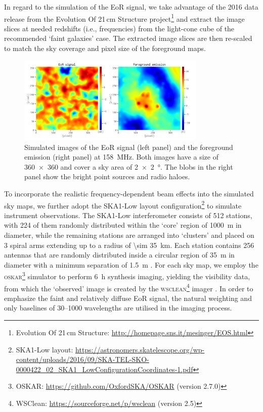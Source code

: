 \documentclass[fleqn,usenatbib]{mnras}
\newcommand{\editwip}[1]{{\leavevmode\color{magenta}#1}}
\begin{document}
{In regard to the simulation of the EoR signal, we take advantage of the
2016 data release from the Evolution Of 21\,cm Structure project\footnote{%
  Evolution Of 21\,cm Structure:
  \url{http://homepage.sns.it/mesinger/EOS.html}}
\citep{mesinger2016} and extract the image slices at needed redshifts
(i.e., frequencies) from the light-cone cube of the recommended
`faint galaxies' case.
The extracted image slices are then re-scaled to match the sky coverage and
pixel size of the foreground maps.

\begin{figure}
  \centering
  \includegraphics[width=0.8\textwidth]{obsimg-158}
  \caption{\label{fig:obsimg}\editwip{%
    Simulated images of the EoR signal (left panel) and the foreground
    emission (right panel) at \SI{158}{\MHz}.
    Both images have a size of \num{360 x 360} and cover a sky area of
    \SI{2 x 2}{\degree}.
    The blobs in the right panel show the bright point sources and radio
    haloes.
  }}
\end{figure}

To incorporate the realistic frequency-dependent beam effects into the
simulated sky maps, we further adopt the SKA1-Low layout
configuration\footnote{\raggedright%
  SKA1-Low layout:
  \url{https://astronomers.skatelescope.org/wp-content/uploads/2016/09/SKA-TEL-SKO-0000422_02_SKA1_LowConfigurationCoordinates-1.pdf}}
to simulate instrument observations.
The SKA1-Low interferometer consists of 512 stations, with 224 of them
randomly distributed within the `core' region of \SI{1000}{\meter} in
diameter, while the remaining stations are arranged into `clusters' and
placed on 3 spiral arms extending up to a radius of
\SI{\sim 35}{\kilo\meter}.
Each station contains 256 antennas that are randomly distributed inside a
circular region of \SI{35}{\meter} in diameter with a minimum separation of
\SI{1.5}{\meter} \citep{mort2017}.
For each sky map, we employ the \textsc{oskar}\footnote{%
  OSKAR: \url{https://github.com/OxfordSKA/OSKAR} (version 2.7.0)}
simulator \citep{mort2010} to perform \SI{6}{\hour} synthesis imaging,
yielding the visibility data, from which the `observed'
image is created by the \textsc{wsclean}\footnote{%
  WSClean: \url{https://sourceforge.net/p/wsclean} (version 2.5)}
imager \citep{offringa2014}.
In order to emphasize the faint and relatively diffuse EoR signal, the
natural weighting and only baselines of \numrange{30}{1000} wavelengths are
utilised in the imaging process.} %
\end{document}
